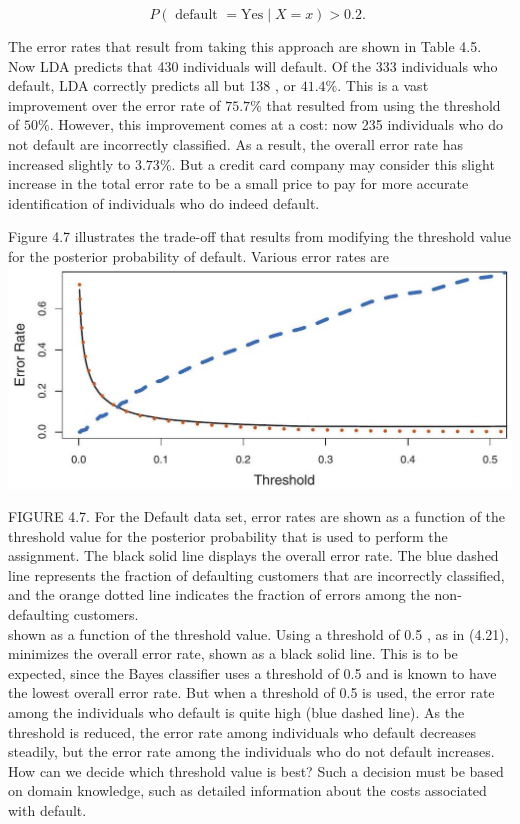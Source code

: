\documentclass[10pt]{article}
\begin{document}
\begin{equation*}
P(\text { default }=\mathrm{Yes} \mid X=x)>0.2 \text {. } \tag{4.22}
\end{equation*}


The error rates that result from taking this approach are shown in Table 4.5. Now LDA predicts that 430 individuals will default. Of the 333 individuals who default, LDA correctly predicts all but 138 , or $41.4 \%$. This is a vast improvement over the error rate of $75.7 \%$ that resulted from using the threshold of $50 \%$. However, this improvement comes at a cost: now 235 individuals who do not default are incorrectly classified. As a result, the overall error rate has increased slightly to $3.73 \%$. But a credit card company may consider this slight increase in the total error rate to be a small price to pay for more accurate identification of individuals who do indeed default.

Figure 4.7 illustrates the trade-off that results from modifying the threshold value for the posterior probability of default. Various error rates are\\
\includegraphics[max width=\textwidth, center]{2025_05_05_efe77898333945044de4g-162}

FIGURE 4.7. For the Default data set, error rates are shown as a function of the threshold value for the posterior probability that is used to perform the assignment. The black solid line displays the overall error rate. The blue dashed line represents the fraction of defaulting customers that are incorrectly classified, and the orange dotted line indicates the fraction of errors among the non-defaulting customers.\\
shown as a function of the threshold value. Using a threshold of 0.5 , as in (4.21), minimizes the overall error rate, shown as a black solid line. This is to be expected, since the Bayes classifier uses a threshold of 0.5 and is known to have the lowest overall error rate. But when a threshold of 0.5 is used, the error rate among the individuals who default is quite high (blue dashed line). As the threshold is reduced, the error rate among individuals who default decreases steadily, but the error rate among the individuals who do not default increases. How can we decide which threshold value is best? Such a decision must be based on domain knowledge, such as detailed information about the costs associated with default.
\end{document}
